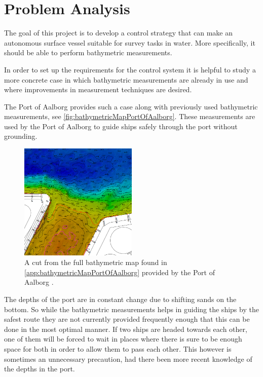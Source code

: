 \chapter{Problem Analysis}
%
The goal of this project is to develop a control strategy that can make an autonomous surface vessel suitable for survey tasks in water. More specifically, it should be able to perform bathymetric measurements.

In order to set up the requirements for the control system it is helpful to study a more concrete case in which bathymetric measurements are already in use and where improvements in measurement techniques are desired.

The Port of Aalborg provides such a case along with previously used bathymetric measurements, see \autoref{fig:bathymetricMapPortOfAalborg}. These measurements are used by the Port of Aalborg to guide ships safely through the port without grounding.

\begin{figure}[H]
  \includegraphics[width=0.5\textwidth]{figures/smallDebthMapAalborg}
  \caption{A cut from the full bathymetric map found in \autoref{app:bathymetricMapPortOfAalborg} provided by the Port of Aalborg .}
  \label{fig:bathymetricMapPortOfAalborg}
\end{figure}

The depths of the port are in constant change due to shifting sands on the bottom. So while the bathymetric measurements helps in guiding the ships by the safest route they are not currently provided frequently enough that this can be done in the most optimal manner. If two ships are headed towards each other, one of them will be forced to wait in places where there is sure to be enough space for both in order to allow them to pass each other. This however is sometimes an unnecessary precaution, had there been more recent knowledge of the depths in the port.

